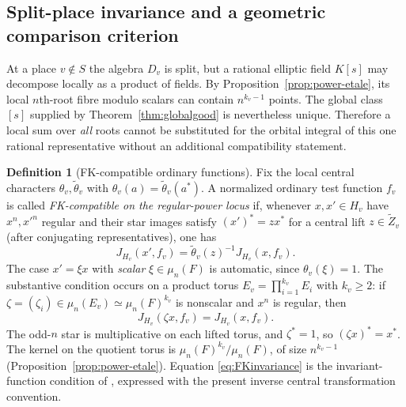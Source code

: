 \documentclass[11pt]{article}
\theoremstyle{plain}
\theoremstyle{definition}
\newtheorem{definition}[theorem]{Definition}
\begin{document}
\subsection{Split-place invariance and a geometric comparison criterion}
At a place $v\notin S$ the algebra $D_v$ is split, but a rational
elliptic field $K[s]$ may decompose locally as a product of fields.
By Proposition~\ref{prop:power-etale}, its local $n$th-root fibre
modulo scalars can contain $n^{k_v-1}$ points.  The global class
$[s]$ supplied by Theorem~\ref{thm:globalgood} is nevertheless
unique.  Therefore a local sum over \emph{all} roots cannot be substituted
for the orbital integral of this one rational representative without
an additional compatibility statement.

\begin{definition}[FK-compatible ordinary functions]\label{def:FKcompatible}
Fix the local central characters $\theta_v,\widetilde\theta_v$
with $\theta_v(a)=\widetilde\theta_v(a^*)$.  A normalized
ordinary test function $f_v$ is called \emph{FK-compatible on the
regular-power locus} if, whenever $x,x'\in H_v$ have $x^n,x'^n$
regular and their star images satisfy
$({x'})^*=z x^*$ for a central lift $z\in\widetilde Z_v$
(after conjugating representatives), one has
\begin{equation}\label{eq:FKinvariance}
 J_{H_v}(x',f_v)
   =\widetilde\theta_v(z)^{-1}J_{H_v}(x,f_v).
\end{equation}
The case $x'=\xi x$ with \emph{scalar} $\xi\in\mu_n(F)$
is automatic, since $\theta_v(\xi)=1$.  The substantive
condition occurs on a product torus
$E_v=\prod_{i=1}^{k_v}E_i$ with $k_v\ge2$:
if $\zeta=(\zeta_i)\in\mu_n(E_v)\simeq\mu_n(F)^{k_v}$
is nonscalar and $x^n$ is regular, then
\begin{equation}\label{eq:nonscalar-root-invariance}
 J_{H_v}(\zeta x,f_v)=J_{H_v}(x,f_v).
\end{equation}
The odd-$n$ star is multiplicative on each lifted torus, and
$\zeta^*=1$, so $(\zeta x)^*=x^*$.  The kernel on the
quotient torus is $\mu_n(F)^{k_v}/\mu_n(F)$, of size
$n^{k_v-1}$ (Proposition~\ref{prop:power-etale}).
Equation \eqref{eq:FKinvariance} is the invariant-function
condition of \cite[\S6]{FK}, expressed with the present
inverse central transformation convention.
\end{definition}
\end{document}
